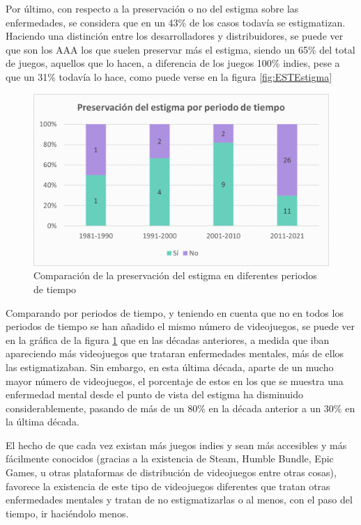 \documentclass[12pt, a4paper,twoside,titlepage]{book}
\begin{document}
Por último, con respecto a la preservación o no del estigma sobre las enfermedades, se considera que en un 43\% de los casos todavía se estigmatizan. Haciendo una distinción entre los desarrolladores y distribuidores, se puede ver que son los AAA los que suelen preservar más el estigma, siendo un 65\% del total de juegos, aquellos que lo hacen, a diferencia de los juegos 100\% indies, pese a que un 31\% todavía lo hace, como puede verse en la figura \ref{fig:ESTEstigma}

\begin{figure}
    \centering
    \includegraphics[width=.8\linewidth]{Graficas estudio/G18; EstigmaTiempo.png}
    \caption{Comparación de la preservación del estigma en diferentes periodos de tiempo}
    \label{fig:ESTEstigmatiempo}
\end{figure}

Comparando por periodos de tiempo, y teniendo en cuenta que no en todos los periodos de tiempo se han añadido el mismo número de videojuegos, se puede ver en la gráfica de la figura \ref{fig:ESTEstigmatiempo} que en las décadas anteriores, a medida que iban apareciendo más videojuegos que trataran enfermedades mentales, más de ellos las estigmatizaban. Sin embargo, en esta última década, aparte de un mucho mayor número de videojuegos, el porcentaje de estos en los que se muestra una enfermedad mental desde el punto de vista del estigma ha disminuido considerablemente, pasando de más de un 80\% en la década anterior a un 30\% en la última década. 

El hecho de que cada vez existan más juegos indies y sean más accesibles y más fácilmente conocidos (gracias a la existencia de Steam, Humble Bundle, Epic Games, u otras plataformas de distribución de videojuegos entre otras cosas), favorece la existencia de este tipo de videojuegos diferentes que tratan otras enfermedades mentales y tratan de no estigmatizarlas o al menos, con el paso del tiempo, ir haciéndolo menos. 
\end{document}
